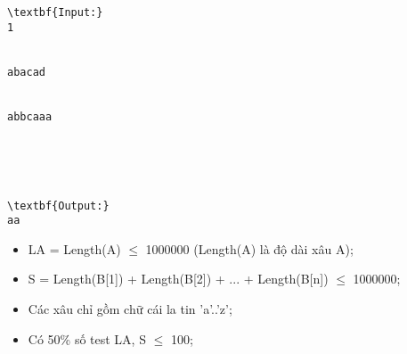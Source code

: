 \begin{verbatim}
\textbf{Input:}
1


abacad


abbcaaa





\textbf{Output:}
aa\end{verbatim}
\begin{itemize}
	\item     LA = Length(A)  $\le$  1000000 (Length(A) là độ dài xâu A);   
	\item     S = Length(B[1]) + Length(B[2]) + ... + Length(B[n])  $\le$  1000000;   
	\item     Các xâu chỉ gồm chữ cái la tin 'a'..'z';   
	\item     Có 50\% số test LA, S  $\le$  100;   
\end{itemize}